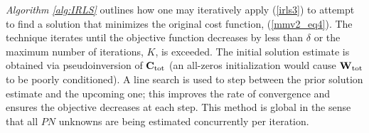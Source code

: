 \documentclass[final]{siamltex}
\newcommand{\la}[1]{\mbox{$\mathbf{#1}$}}  \newcommand{\sst}[1]{\mbox{\scriptsize{#1}}}
\begin{document}
    {\em{Algorithm \ref{alg:IRLS}}} outlines how one may iteratively
    apply (\ref{irls3}) to attempt to find a solution that minimizes
    the original cost function, (\ref{mmv2_eq4}).  The technique
    iterates until the objective function decreases by less than
    $\delta$ or the maximum number of iterations, $K$, is exceeded.
    The initial solution estimate is obtained via pseudoinversion of
    $\la{C}_{\sst{tot}}$ (an all-zeros initialization would cause
    $\la{W}_{\sst{tot}}$ to be poorly conditioned).  A line search is
    used to step between the prior solution estimate and the upcoming
    one; this improves the rate of convergence and ensures the
    objective decreases at each step.  This method is global in the
    sense that all $PN$ unknowns are being estimated concurrently per
    iteration.
\end{document}
